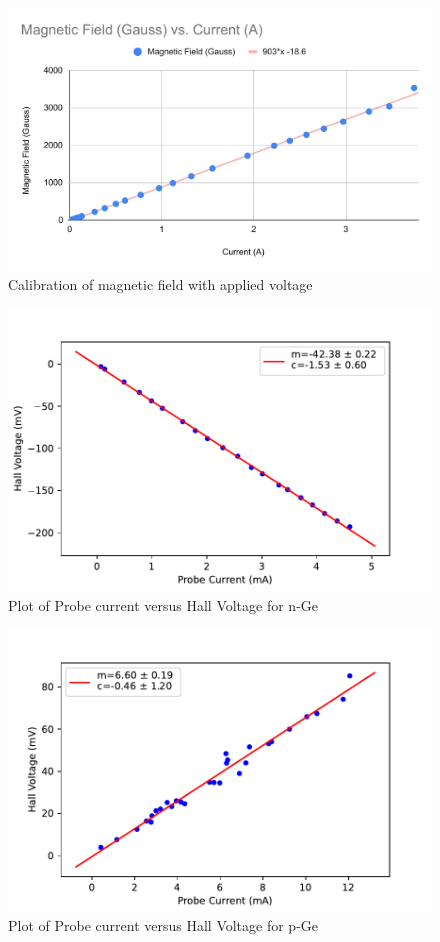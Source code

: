 \documentclass[a4paper, amsfonts, amssymb, amsmath, reprint, showkeys, nofootinbib, twoside]{revtex4-1}
\begin{document}
\begin{figure}[H]
	\centering
	\includegraphics[scale=0.4]{2} 
	\caption{Calibration of magnetic field with applied voltage}
	\label{3}
\end{figure}

\begin{figure}[H]
	\centering
	\includegraphics[scale=0.55]{3} 
	\caption{Plot of Probe current versus Hall Voltage for n-Ge}
	\label{4}
\end{figure}

\begin{figure}[H]
	\centering
	\includegraphics[scale=0.55]{4} 
	\caption{Plot of Probe current versus Hall Voltage for p-Ge}
	\label{5}
\end{figure}
\end{document}

